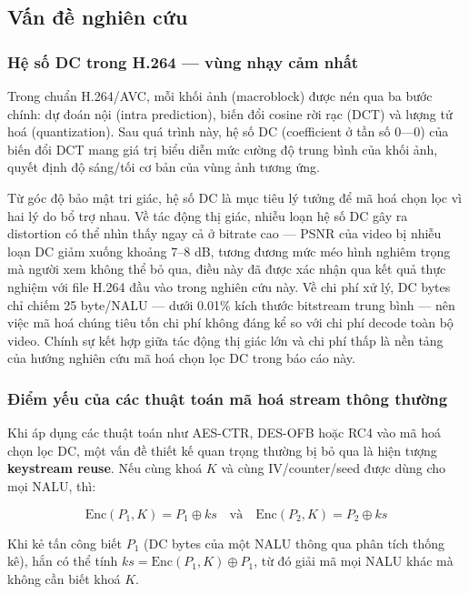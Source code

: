 \subsection{Vấn đề nghiên cứu}

\subsubsection{Hệ số DC trong H.264 --- vùng nhạy cảm nhất}

Trong chuẩn H.264/AVC, mỗi khối ảnh (macroblock) được nén qua ba bước chính: dự đoán nội (intra prediction), biến đổi cosine rời rạc (DCT) và lượng tử hoá (quantization). Sau quá trình này, hệ số DC (coefficient ở tần số 0---0) của biến đổi DCT mang giá trị biểu diễn mức cường độ trung bình của khối ảnh, quyết định độ sáng/tối cơ bản của vùng ảnh tương ứng.

Từ góc độ bảo mật tri giác, hệ số DC là mục tiêu lý tưởng để mã hoá chọn lọc vì hai lý do bổ trợ nhau. Về tác động thị giác, nhiễu loạn hệ số DC gây ra distortion có thể nhìn thấy ngay cả ở bitrate cao --- PSNR của video bị nhiễu loạn DC giảm xuống khoảng 7--8 dB, tương đương mức méo hình nghiêm trọng mà người xem không thể bỏ qua, điều này đã được xác nhận qua kết quả thực nghiệm với file H.264 đầu vào trong nghiên cứu này. Về chi phí xử lý, DC bytes chỉ chiếm 25 byte/NALU --- dưới 0.01\% kích thước bitstream trung bình --- nên việc mã hoá chúng tiêu tốn chi phí không đáng kể so với chi phí decode toàn bộ video. Chính sự kết hợp giữa tác động thị giác lớn và chi phí thấp là nền tảng của hướng nghiên cứu mã hoá chọn lọc DC trong báo cáo này.

\subsubsection{Điểm yếu của các thuật toán mã hoá stream thông thường}

Khi áp dụng các thuật toán như AES-CTR, DES-OFB hoặc RC4 vào mã hoá chọn lọc DC, một vấn đề thiết kế quan trọng thường bị bỏ qua là hiện tượng \textbf{keystream reuse}. Nếu cùng khoá $K$ và cùng IV/counter/seed được dùng cho mọi NALU, thì:

\begin{equation}
\text{Enc}(P_1, K) = P_1 \oplus ks \quad\text{và}\quad \text{Enc}(P_2, K) = P_2 \oplus ks
\end{equation}

Khi kẻ tấn công biết $P_1$ (DC bytes của một NALU thông qua phân tích thống kê), hắn có thể tính $ks = \text{Enc}(P_1, K) \oplus P_1$, từ đó giải mã mọi NALU khác mà không cần biết khoá $K$.

